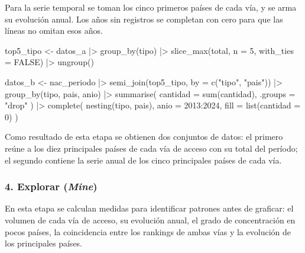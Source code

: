 \documentclass[
  letterpaper,
  DIV=11,
  numbers=noendperiod]{scrartcl}
\newenvironment{Shaded}{\begin{snugshade}}{\end{snugshade}}
\newcommand{\AttributeTok}[1]{\textcolor[rgb]{0.40,0.45,0.13}{#1}}
\newcommand{\ConstantTok}[1]{\textcolor[rgb]{0.56,0.35,0.01}{#1}}
\newcommand{\DecValTok}[1]{\textcolor[rgb]{0.68,0.00,0.00}{#1}}
\newcommand{\FunctionTok}[1]{\textcolor[rgb]{0.28,0.35,0.67}{#1}}
\newcommand{\NormalTok}[1]{\textcolor[rgb]{0.00,0.23,0.31}{#1}}
\newcommand{\OtherTok}[1]{\textcolor[rgb]{0.00,0.23,0.31}{#1}}
\newcommand{\SpecialCharTok}[1]{\textcolor[rgb]{0.37,0.37,0.37}{#1}}
\newcommand{\StringTok}[1]{\textcolor[rgb]{0.13,0.47,0.30}{#1}}
\begin{document}
Para la serie temporal se toman los cinco primeros países de cada vía, y
se arma su evolución anual. Los años sin registros se completan con cero
para que las líneas no omitan esos años.

\begin{Shaded}
\begin{Highlighting}[]
\NormalTok{top5\_tipo }\OtherTok{\textless{}{-}}\NormalTok{ datos\_a }\SpecialCharTok{|\textgreater{}}
  \FunctionTok{group\_by}\NormalTok{(tipo) }\SpecialCharTok{|\textgreater{}}
  \FunctionTok{slice\_max}\NormalTok{(total, }\AttributeTok{n =} \DecValTok{5}\NormalTok{, }\AttributeTok{with\_ties =} \ConstantTok{FALSE}\NormalTok{) }\SpecialCharTok{|\textgreater{}}
  \FunctionTok{ungroup}\NormalTok{()}

\NormalTok{datos\_b }\OtherTok{\textless{}{-}}\NormalTok{ nac\_periodo }\SpecialCharTok{|\textgreater{}}
  \FunctionTok{semi\_join}\NormalTok{(top5\_tipo, }\AttributeTok{by =} \FunctionTok{c}\NormalTok{(}\StringTok{"tipo"}\NormalTok{, }\StringTok{"pais"}\NormalTok{)) }\SpecialCharTok{|\textgreater{}}
  \FunctionTok{group\_by}\NormalTok{(tipo, pais, anio) }\SpecialCharTok{|\textgreater{}}
  \FunctionTok{summarise}\NormalTok{(}
    \AttributeTok{cantidad =} \FunctionTok{sum}\NormalTok{(cantidad),}
    \AttributeTok{.groups =} \StringTok{"drop"}
\NormalTok{  ) }\SpecialCharTok{|\textgreater{}}
  \FunctionTok{complete}\NormalTok{(}
    \FunctionTok{nesting}\NormalTok{(tipo, pais),}
    \AttributeTok{anio =} \DecValTok{2013}\SpecialCharTok{:}\DecValTok{2024}\NormalTok{,}
    \AttributeTok{fill =} \FunctionTok{list}\NormalTok{(}\AttributeTok{cantidad =} \DecValTok{0}\NormalTok{)}
\NormalTok{  )}
\end{Highlighting}
\end{Shaded}

Como resultado de esta etapa se obtienen dos conjuntos de datos: el
primero reúne a los diez principales países de cada vía de acceso con su
total del período; el segundo contiene la serie anual de los cinco
principales países de cada vía.

\subsubsection{\texorpdfstring{4. Explorar
(\emph{Mine})}{4. Explorar (Mine)}}\label{explorar-mine}

En esta etapa se calculan medidas para identificar patrones antes de
graficar: el volumen de cada vía de acceso, su evolución anual, el grado
de concentración en pocos países, la coincidencia entre los rankings de
ambas vías y la evolución de los principales países.
\end{document}
